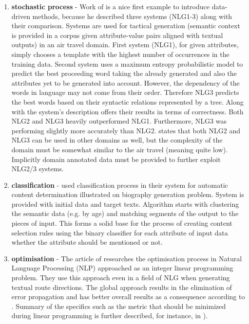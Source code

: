 \begin{enumerate}
	\item \textbf{stochastic process} - Work of \cite{ratnaparkhi2000trainable} is a nice first example to introduce data-driven methods, because he described three systems (NLG1-3) along with their comparison. Systems are used for tactical generation (semantic context is provided in a corpus given attribute-value pairs aligned with textual outputs) in an air travel domain. First system (NLG1), for given attributes, simply chooses a template with the highest number of occurrences in the training data. Second system uses a maximum entropy probabilistic model to predict the best proceeding  word taking the already generated and also the attributes yet to be generated into account. However, the dependency of the words in language may not come from their order. Therefore NLG3 predicts the best words based on their syntactic relations represented by a tree. Along with the system's description \cite{ratnaparkhi2000trainable} offers their results in terms of correctness. Both NLG2 and NLG3 heavily outperformed NLG1. Furthermore, NLG3 was performing slightly more accurately than NLG2.  \cite{ratnaparkhi2000trainable} states that both NLG2 and NLG3 can be used in other domains as well, but the complexity of the domain must be somewhat similar to the air travel (meaning quite low). Implicitly domain annotated data must be provided to further exploit NLG2/3 systems.\label{dd-1}
	\item \textbf{classification} - \cite{duboue2003statistical} used classification process in their system for automatic content determination illustrated on biography generation problem. System is provided with initial data and target texts. Algorithm starts with clustering the semantic data (e.g. by age) and matching segments of the output to the pieces of input. This forms a solid base for the process of creating content selection rules using the binary classifier for each attribute of input data whether the attribute should be mentioned or not.\label{dd-2}
	\item \textbf{optimisation} - The article of \cite{marciniak2005beyond} researches the optimisation process in Natural Language Processing (NLP) approached as an integer linear programming problem. They use this approach even in a field of NLG when generating textual route directions. The global approach results in the elimination of error propagation and has better overall results as a consequence according to \cite{marciniak2005beyond}. Summary of the specifics such as the metric that should be minimized during linear programming is further described, for instance, in \cite{gatt2018survey}).\label{dd-3}

\end{enumerate}

